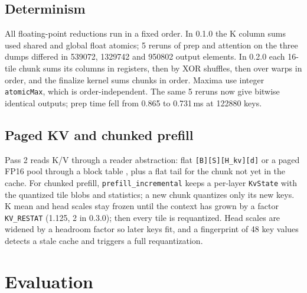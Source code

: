 \documentclass[10pt,twocolumn]{article}
\newcommand{\code}[1]{\texttt{#1}}
\begin{document}
\subsection{Determinism}

All floating-point reductions run in a fixed order. In 0.1.0 the K column sums used shared and global float
atomics; 5 reruns of prep and attention on the three dumps differed in 539072, 1329742 and 950802 output
elements. In 0.2.0 each 16-tile chunk sums its columns in registers, then by XOR shuffles, then over warps in
order, and the finalize kernel sums chunks in order. Maxima use integer \code{atomicMax}, which is
order-independent. The same 5 reruns now give bitwise identical outputs; prep time fell from 0.865 to
0.731\,ms at 122880 keys.

\subsection{Paged KV and chunked prefill}

Pass 2 reads K/V through a reader abstraction: flat \code{[B][S][H\_kv][d]} or a paged FP16 pool through a
block table \cite{kwon2023pagedattention}, plus a flat tail for the chunk not yet in the cache. For chunked
prefill, \code{prefill\_incremental} keeps a per-layer \code{KvState} with the quantized tile blobs and
statistics; a new chunk quantizes only its new keys. K mean and head scales stay frozen until the context
has grown by a factor \code{KV\_RESTAT} (1.125, 2 in 0.3.0); then every tile is requantized. Head scales are
widened by a headroom factor so later keys fit, and a fingerprint of 48 key values detects a stale cache and triggers a full requantization.

\section{Evaluation}
\label{sec:eval}
\end{document}
